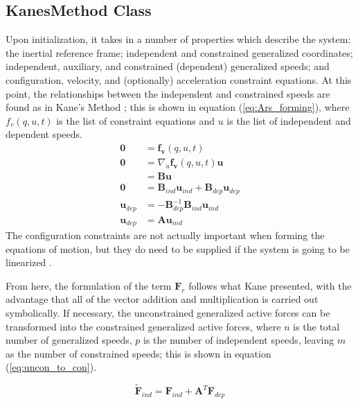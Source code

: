 \documentclass[twocolumn,10pt, final]{asme2e}
\begin{document}
\subsection*{KanesMethod Class}
Upon initialization, it takes in a number of properties which describe the
system: the inertial reference frame; independent and constrained generalized
coordinates; independent, auxiliary, and constrained (dependent) generalized
speeds; and configuration, velocity, and (optionally) acceleration constraint
equations. At this point, the relationships between the independent and
constrained speeds are found as in Kane's Method \cite{Kane1985}; this is shown
in equation (\ref{eq:Ars_forming}), where $f_v(q, u, t)$ is the list of
constraint equations and $u$ is the list of independent and dependent speeds.
\begin{align}
\mathbf{0} &= \mathbf{f_v}(q, u, t) \\
\mathbf{0} &= \nabla_u \mathbf{f_v}(q, u, t) \mathbf{u} \\
           &= \mathbf{B} \mathbf{u} \\
\mathbf{0} &= \mathbf{B}_{ind} \mathbf{u}_{ind} + \mathbf{B}_{dep}
\mathbf{u}_{dep} \\
\mathbf{u}_{dep} &= - \mathbf{B}_{dep}^{-1} \mathbf{B}_{ind} \mathbf{u}_{ind} \\
\mathbf{u}_{dep} &= \mathbf{A} \mathbf{u}_{ind}
\label{eq:Ars_forming}
\end{align}
The configuration constraints are not actually important when forming the
equations of motion, but they do need to be supplied if the system is going to
be linearized \cite{Peterson2013}.

From here, the formulation of the term $\mathbf{F}_r$ follows what Kane
presented, with the advantage that all of the vector addition and
multiplication is carried out symbolically.  If necessary, the unconstrained
generalized active forces can be transformed into the constrained generalized
active forces, where $n$ is the total number of generalized speeds, $p$ is the
number of independent speeds, leaving $m$ as the number of constrained speeds;
this is shown in equation (\ref{eq:uncon_to_con}).

\begin{equation}
\label{eq:uncon_to_con}
\tilde{\mathbf{F}}_{ind} = \mathbf{F}_{ind} + \mathbf{A}^{T}
\mathbf{F}_{dep}
\end{equation}
\end{document}
